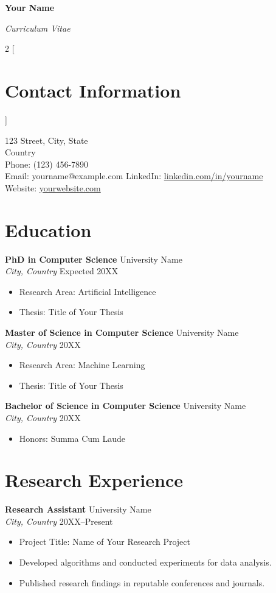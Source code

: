 \documentclass[11pt,a4paper]{article}
\renewcommand{\maketitle}{
    \begin{center}
        \textbf{\huge Your Name}
        
        \vspace{2pt}
        \textit{Curriculum Vitae}
    \end{center}
}
\newcommand{\cvsection}[1]{\section*{#1}}
\newcommand{\cventry}[4]{\textbf{#1} \hfill {#2} \\ \textit{#3} \hfill {#4}}
\begin{document}
\maketitle

\begin{multicols}{2}
[
\section*{Contact Information}
]
\raggedright
123 Street, City, State \\
Country \\
Phone: (123) 456-7890 \\
Email: yourname@example.com
\columnbreak
\raggedleft
LinkedIn: \href{https://www.linkedin.com/in/yourname}{linkedin.com/in/yourname} \\
Website: \href{https://www.yourwebsite.com}{yourwebsite.com}
\end{multicols}

\cvsection{Education}
\cventry{PhD in Computer Science}{University Name}{City, Country}{Expected 20XX}
\begin{itemize}[leftmargin=*, topsep=0pt, itemsep=0pt]
    \item Research Area: Artificial Intelligence
    \item Thesis: Title of Your Thesis
\end{itemize}

\cventry{Master of Science in Computer Science}{University Name}{City, Country}{20XX}
\begin{itemize}[leftmargin=*, topsep=0pt, itemsep=0pt]
    \item Research Area: Machine Learning
    \item Thesis: Title of Your Thesis
\end{itemize}

\cventry{Bachelor of Science in Computer Science}{University Name}{City, Country}{20XX}
\begin{itemize}[leftmargin=*, topsep=0pt, itemsep=0pt]
    \item Honors: Summa Cum Laude
\end{itemize}

\cvsection{Research Experience}
\cventry{Research Assistant}{University Name}{City, Country}{20XX--Present}
\begin{itemize}[leftmargin=*, topsep=0pt, itemsep=0pt]
    \item Project Title: Name of Your Research Project
    \item Developed algorithms and conducted experiments for data analysis.
    \item Published research findings in reputable conferences and journals.
\end{itemize}
\end{document}
